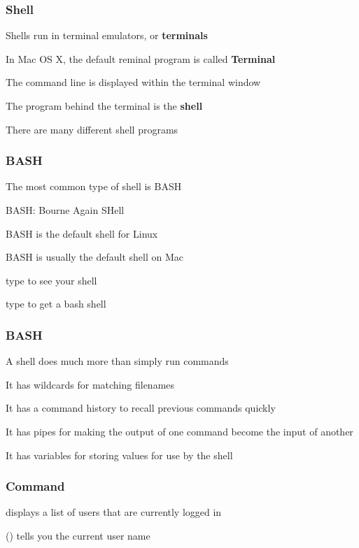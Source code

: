 \documentclass[12pt]{beamer}\usepackage[]{graphicx}\usepackage[]{color}
\begin{document}

\begin{frame}
\frametitle{Shell}
\bi
  \item Shells run in terminal emulators, or \textbf{terminals}
  \item In Mac OS X, the default reminal program is called \textbf{Terminal}
  \item The command line is displayed within the terminal window
  \item The program behind the terminal is the \textbf{shell}
  \item There are many different shell programs
\ei
\end{frame}


\begin{frame}
\frametitle{BASH}

The most common type of shell is BASH
\bi
  \item BASH: Bourne Again SHell
  \item BASH is the default shell for Linux
  \item BASH is usually the default shell on Mac
  \item type {\hilit {}} to see your shell
  \item type {\hilit {}} to get a bash shell
\ei
\end{frame}


\begin{frame}
\frametitle{BASH}
\bi
  \item A shell does much more than simply run commands
  \item It has wildcards for matching filenames
  \item It has a command history to recall previous commands quickly
  \item It has pipes for making the output of one command become the input of another
  \item It has variables for storing values for use by the shell
\ei
\end{frame}


\begin{frame}
\frametitle{Command }
\bbi
  \item {} displays a list of users that are currently logged in
  \item {} () tells you the current user name
\ei
\end{frame}
\end{document}
